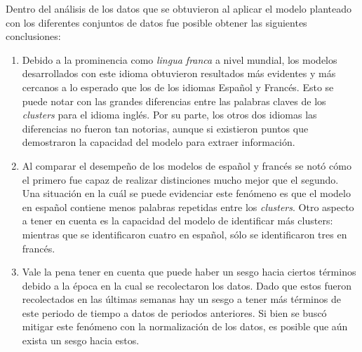 Dentro del análisis de los datos que se obtuvieron al aplicar el modelo planteado con los diferentes conjuntos de datos fue posible obtener las siguientes conclusiones:
\begin{enumerate}
    \item Debido a la prominencia como \textit{lingua franca} a nivel mundial, los modelos desarrollados con este idioma obtuvieron resultados más evidentes y más cercanos a lo esperado que los de los idiomas Español y Francés. Esto se puede notar con las grandes diferencias entre las palabras claves de los \textit{clusters} para el idioma inglés. Por su parte, los otros dos idiomas las diferencias no fueron tan notorias, aunque si existieron puntos que demostraron la capacidad del modelo para extraer información.
    \item Al comparar el desempeño de los modelos de español y francés se notó cómo el primero fue capaz de realizar distinciones mucho mejor que el segundo. Una situación en la cuál se puede evidenciar este fenómeno es que el modelo en español contiene menos palabras repetidas entre los \textit{clusters}. Otro aspecto a tener en cuenta es la capacidad del modelo de identificar más clusters: mientras que se identificaron cuatro en español, sólo se identificaron tres en francés.
    \item Vale la pena tener en cuenta que puede haber un sesgo hacia ciertos términos debido a la época en la cual se recolectaron los datos. Dado que estos fueron recolectados en las últimas semanas hay un sesgo a tener más términos de este periodo de tiempo a datos de periodos anteriores. Si bien se buscó mitigar este fenómeno con la normalización de los datos, es posible que aún exista un sesgo hacia estos.
\end{enumerate}
